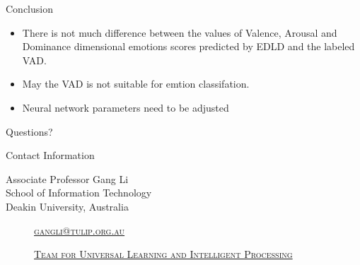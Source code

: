 \documentclass[
 size=14pt,
 paper=smartboard,  %
 mode=present, 		%
 display=slides, 	%
 style=tuliplab,  	%
 pauseslide,
 fleqn,leqno]{powerdot}
\begin{document}
\begin{slide}[toc=,bm=]{Conclusion}

\bigskip
\begin{itemize}
	\item
	\smallskip
	There is not much difference between 
	the values of Valence, Arousal and Dominance 
	dimensional emotions scores predicted by EDLD
	and the labeled VAD.
	
	\smallskip
	
	\item
	\smallskip
	May the VAD is not suitable 
	for emtion classifation.
	
	\item
	\smallskip
	Neural network parameters need to be adjusted
\end{itemize}


\end{slide}


%
\begin{slide}[toc=,bm=]{Questions?}
\begin{center}
\begin{figure}
\end{figure}
\end{center}
\end{slide}


\begin{wideslide}[toc=,bm=]{Contact Information}
\centering
{}
\twocolumn[
lcolwidth=0.35\linewidth,
rcolwidth=0.65\linewidth
]
{
}
{
Associate Professor Gang Li\\
School of Information Technology\\
Deakin University, Australia
\begin{description}
 \item[\textcolor{orange}{\faEnvelope}] \href{mailto:gangli@tulip.org.au}
 {\textsc{\footnotesize{gangli@tulip.org.au}}}

 \item[\textcolor{orange}{\faHome}] \href{http://www.tulip.org.au}
 {\textsc{\footnotesize{Team for Universal Learning and Intelligent Processing}}}
\end{description}
}
\end{wideslide}
\end{document}

